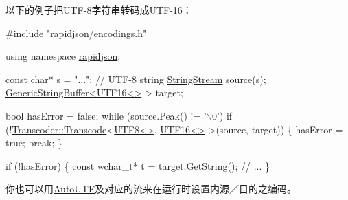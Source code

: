 以下的例子把\+U\+T\+F-\/8字符串转码成\+U\+T\+F-\/16：


\begin{DoxyCode}
\textcolor{preprocessor}{#include "rapidjson/encodings.h"}

\textcolor{keyword}{using namespace }\hyperlink{namespacerapidjson}{rapidjson};

\textcolor{keyword}{const} \textcolor{keywordtype}{char}* s = \textcolor{stringliteral}{"..."}; \textcolor{comment}{// UTF-8 string}
\hyperlink{struct_generic_string_stream}{StringStream} source(s);
\hyperlink{class_generic_string_buffer}{GenericStringBuffer<UTF16<>} > target;

\textcolor{keywordtype}{bool} hasError = \textcolor{keyword}{false};
\textcolor{keywordflow}{while} (source.Peak() != \textcolor{charliteral}{'\(\backslash\)0'})
    \textcolor{keywordflow}{if} (!\hyperlink{struct_transcoder_a0ea2edfe35784ebf1063921d2bd5fb66}{Transcoder::Transcode}<\hyperlink{struct_u_t_f8}{UTF8<>}, \hyperlink{struct_u_t_f16}{UTF16<>} >(source, target)) \{
        hasError = \textcolor{keyword}{true};
        \textcolor{keywordflow}{break};
    \}

\textcolor{keywordflow}{if} (!hasError) \{
    \textcolor{keyword}{const} \textcolor{keywordtype}{wchar\_t}* t = target.GetString();
    \textcolor{comment}{// ...}
\}
\end{DoxyCode}


你也可以用{\ttfamily \hyperlink{struct_auto_u_t_f}{Auto\+U\+TF}}及对应的流来在运行时设置内源／目的之编码。 